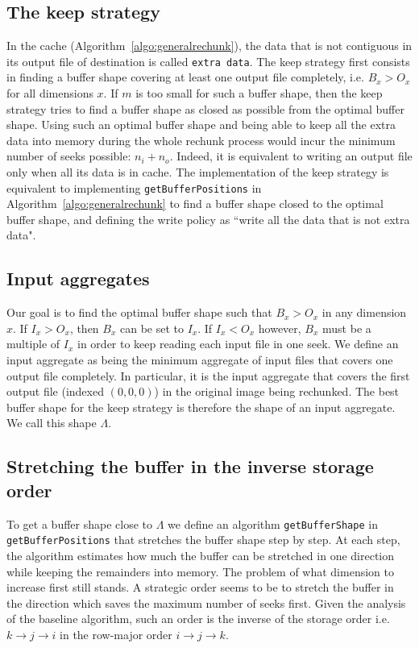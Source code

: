 \documentclass[conference]{IEEEtran}
\begin{document}
\subsection{The keep strategy}
In the cache (Algorithm~\ref{algo:generalrechunk}), the data that is not
contiguous in its output file of destination is called \texttt{extra data}.
The keep strategy first consists in finding a buffer shape covering at least
one output file completely, i.e. $B_x>O_x$ for all dimensions $x$. If $m$ is too
small for such a buffer shape, then the keep strategy tries to find a buffer
shape as closed as possible from the optimal buffer shape. Using such an optimal
buffer shape and being able to keep all the extra data into memory during the
whole rechunk process would incur the minimum number of seeks possible: $n_i + n_o$.
Indeed, it is equivalent to writing an output file only when all its data is in
cache.
The implementation of the keep strategy is equivalent to implementing
\texttt{getBufferPositions} in Algorithm~\ref{algo:generalrechunk} to find a
buffer shape closed to the optimal buffer shape, and defining the write policy
as ``write all the data that is not extra data".

\subsection{Input aggregates}
Our goal is to find the optimal buffer shape such that $B_x>O_x$ in any dimension $x$.
If $I_x > O_x$, then $B_x$ can be set to $I_x$. If $I_x < O_x$ however, $B_x$
must be a multiple of $I_x$ in order to keep reading each input file in one seek.
We define an input aggregate as being the minimum aggregate of input files that
covers one output file completely. In particular, it is the input aggregate that
covers the first output file (indexed $(0,0,0)$) in the original image being
rechunked. The best buffer shape for the keep strategy is therefore the shape of
an input aggregate. We call this shape $\Lambda$.

\subsection{Stretching the buffer in the inverse storage order}
To get a buffer shape close to $\Lambda$ we define an algorithm
\texttt{getBufferShape} in \texttt{getBufferPositions} that stretches the
buffer shape step by step. At each step, the algorithm estimates how much the
buffer can be stretched in one direction while keeping the remainders into
memory. The problem of what dimension to increase first still stands. A
strategic order seems to be to stretch the buffer in the direction which saves
the maximum number of seeks first. Given the analysis of the baseline algorithm,
such an order is the inverse of the storage order i.e.
$k \rightarrow j \rightarrow i$ in the row-major order
$i \rightarrow j \rightarrow k$.
\end{document}

